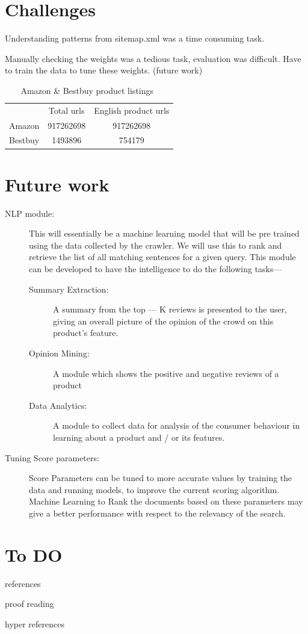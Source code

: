 \documentclass{article}
\begin{document}
\section{Challenges}
\begin{description}
  \item Understanding patterns from sitemap.xml was a time consuming task.
  \item Manually checking the weights was a tedious task, evaluation was difficult.  Have to train the data to tune these weights. (future work)
\end{description}

\begin{table}
  \centering
  \begin{tabular}{c c c} 
    & Total urls & English product urls \\
    Amazon & 917262698 & 917262698\\
    Bestbuy & 1493896 & 754179\\
  \end{tabular}
  \caption{Amazon \& Bestbuy product listings~\label{tab:bestbuy}}
\end{table}

\section{Future work}
\begin{description}
  \item[NLP module:] This will essentially be a machine learning model that will be pre trained using the data collected by the crawler. We will use this to rank and retrieve the list of all matching sentences for a given query. This module can be developed to have the intelligence to do the following tasks---
	\begin{description}
		\item[Summary Extraction: ] A summary from the top --- K reviews is presented to the user, giving an overall picture of the opinion of the crowd on this product's feature. 
		\item[Opinion Mining:] A module which shows the positive and negative reviews of a product
		\item[Data Analytics:] A module to collect data for analysis of the consumer behaviour in learning about a product and / or its features.
	\end{description}
 \item[Tuning Score parameters: ] Score Parameters can be tuned to more accurate values by training the data and running models, to improve the current scoring algorithm. Machine Learning to Rank the documents based on these parameters  may give a better performance with respect to the relevancy of the search.

\end{description}

\section{To DO}
\begin{description}
  \item references
  \item proof reading
  \item hyper references
\end{description}



\end{document}
